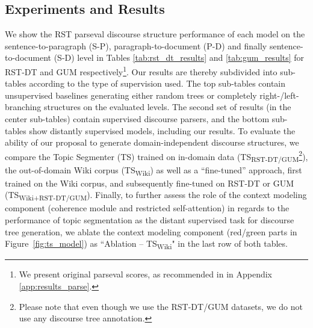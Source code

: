 \documentclass[letterpaper]{article} %
\begin{document}
\subsection{Experiments and Results}
\label{results}
We show the RST parseval discourse structure performance of each model on the sentence-to-paragraph (S-P), paragraph-to-document (P-D) and finally sentence-to-document (S-D) level in Tables \ref{tab:rst_dt_results} and \ref{tab:gum_results} for RST-DT and GUM respectively\footnote{We present original parseval scores, as recommended in \citet{morey-etal-2017-much} in Appendix \ref{app:results_parse}.}. Our results are thereby subdivided into sub-tables according to the type of supervision used. The top sub-tables contain unsupervised baselines generating either random trees or completely right-/left-branching structures on the evaluated levels. The second set of results (in the center sub-tables) contain supervised discourse parsers, and the bottom sub-tables show distantly supervised models, including our results. To evaluate the ability of our proposal to generate domain-independent discourse structures, we compare the Topic Segmenter (TS) trained on in-domain data (TS\textsubscript{RST-DT/GUM}\footnote{Please note that even though we use the RST-DT/GUM datasets, we do not use any discourse tree annotation.}), the out-of-domain Wiki corpus (TS\textsubscript{Wiki}) as well as a ``fine-tuned'' approach, first trained on the Wiki corpus, and subsequently fine-tuned on RST-DT or GUM (TS\textsubscript{Wiki+RST-DT/GUM}). 
Finally, to further assess the role of the context modeling component (coherence module and restricted self-attention) in regards to the performance of topic segmentation as the distant supervised task for discourse tree generation, we ablate the context modeling component (red/green parts in Figure~\ref{fig:ts_model}) as ``Ablation -- TS\textsubscript{Wiki}" in the last row of both tables.
\end{document}
